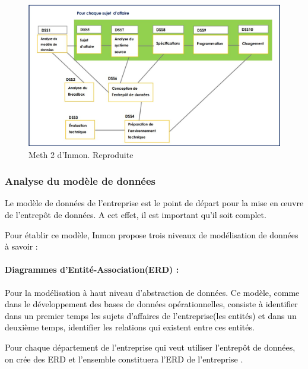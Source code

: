 \documentclass[a4paper,12pt]{report}
\begin{document}
\begin{figure}[H]

\begin{center}
\includegraphics[width=1\linewidth]{./images/3}
\end{center}
\caption{Meth 2 d'Inmon. Reproduite \citep{inmon2002building}}
\label{fig:3}
\end{figure}



\subsubsection{Analyse du modèle de données}

\textcolor{black}{Le modèle de données de l’entreprise est le point de départ pour la mise en œuvre de l’entrepôt de données. A cet effet, il est important qu’il soit complet.}

\textcolor{black}{Pour établir ce modèle, Inmon propose trois niveaux de modélisation de données à savoir : }


\paragraph{Diagrammes d’Entité-Association(ERD) :}

\textcolor{black}{Pour la modélisation à haut niveau d’abstraction de données. Ce modèle, comme dans le développement des bases de données opérationnelles, consiste à identifier dans un premier temps les sujets d’affaires de l’entreprise(les entités) et dans un deuxième temps, identifier les relations qui existent entre ces entités.}

\textcolor{black}{Pour chaque département de l’entreprise qui veut utiliser l’entrepôt de données, on crée des ERD et l’ensemble constituera l’ERD de l’entreprise \citep{inmon2002building}.}
\end{document}
